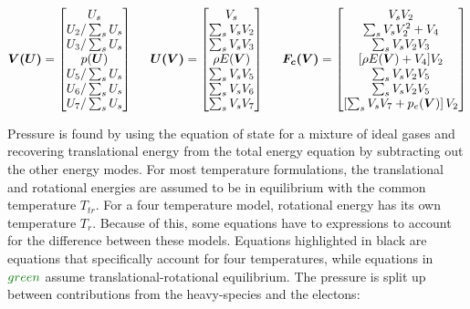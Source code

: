 \documentclass[10pt]{article}
\begin{document}
\begin{flushleft}
\begin{equation*}
    \boldsymbol{\boldsymbol{V}(\boldsymbol{U})} = \begin{bmatrix}
        U_s \\
        U_2 / \sum_s U_s \\
        U_3 / \sum_s U_s \\
        p(\boldsymbol{U}) \\
        U_5 / \sum_s U_s \\
        U_6 / \sum_s U_s \\
        U_7 / \sum_s U_s 
    \end{bmatrix}
    \hspace{5mm}
    \boldsymbol{\boldsymbol{U}(\boldsymbol{V})} = \begin{bmatrix}
        V_s \\
        \sum_s V_s V_2 \\
        \sum_s V_s V_3 \\
        \rho E(\boldsymbol{V}) \\
        \sum_s V_s V_5 \\
        \sum_s V_s V_6 \\
        \sum_s V_s V_7 
    \end{bmatrix}
    \hspace{5mm}
    \boldsymbol{\boldsymbol{F_c}(\boldsymbol{V})} = \begin{bmatrix}
        V_s V_2 \\
        \sum_s V_s V_2^2 + V_4 \\
        \sum_s V_s V_2 V_3 \\
        [\rho E(\boldsymbol{V}) + V_4]V_2 \\
        \sum_s V_s V_2 V_5 \\
        \sum_s V_s V_2 V_5 \\
        \left[ \sum_{s} V_s V_7 + p_e(\boldsymbol{V}) \right] V_2
    \end{bmatrix}   
\end{equation*}

Pressure is found by using the equation of state for a mixture of ideal gases and recovering translational energy from the total energy equation by subtracting out the other energy modes. For most temperature formulations, the translational and rotational energies are assumed to be in equilibrium with the common temperature $T_{tr}$. For a four temperature model, rotational energy has its own temperature $T_r$. Because of this, some equations have to expressions to account for the difference between these models. Equations highlighted in black are equations that specifically account for four temperatures, while equations in $\textcolor{defgreen}{green}$ assume translational-rotational equilibrium. The pressure is split up between contributions from the heavy-species and the electons:


\end{flushleft}
\end{document}
